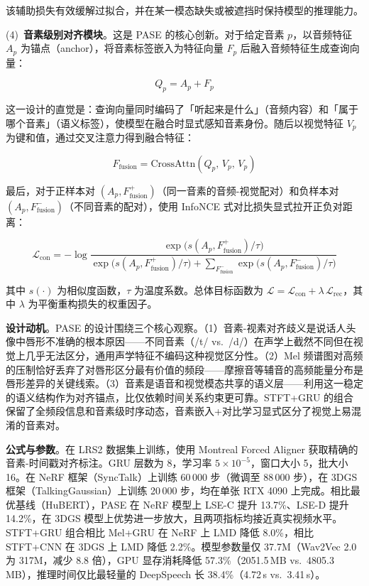 该辅助损失有效缓解过拟合，并在某一模态缺失或被遮挡时保持模型的推理能力。

(4)~\textbf{音素级别对齐模块}。这是 PASE 的核心创新。对于给定音素 $p$，以音频特征 $A_p$ 为锚点（anchor），将音素标签嵌入为特征向量 $F_p$ 后融入音频特征生成查询向量：

\begin{equation}
    Q_p = A_p + F_p
\end{equation}

这一设计的直觉是：查询向量同时编码了「听起来是什么」（音频内容）和「属于哪个音素」（语义标签），使模型在融合时显式感知音素身份。随后以视觉特征 $V_p$ 为键和值，通过交叉注意力得到融合特征：

\begin{equation}
    F_\text{fusion} = \mathrm{CrossAttn}(Q_p,\, V_p,\, V_p)
\end{equation}

最后，对于正样本对 $(A_p, F^+_\text{fusion})$（同一音素的音频-视觉配对）和负样本对 $(A_p, F^-_\text{fusion})$（不同音素的配对），使用 InfoNCE 式对比损失显式拉开正负对距离：

\begin{equation}
    \mathcal{L}_\text{con} = -\log \frac{\exp\big(s(A_p, F^+_\text{fusion}) / \tau\big)}{\exp\big(s(A_p, F^+_\text{fusion}) / \tau\big) + \sum_{F^-_\text{fusion}} \exp\big(s(A_p, F^-_\text{fusion}) / \tau\big)}
\end{equation}

其中 $s(\cdot)$ 为相似度函数，$\tau$ 为温度系数。总体目标函数为 $\mathcal{L} = \mathcal{L}_\text{con} + \lambda\, \mathcal{L}_\text{rec}$，其中 $\lambda$ 为平衡重构损失的权重因子。

\textbf{设计动机}。PASE 的设计围绕三个核心观察。（1）音素-视素对齐歧义是说话人头像中唇形不准确的根本原因——不同音素（/t/ vs.\ /d/）在声学上截然不同但在视觉上几乎无法区分，通用声学特征不编码这种视觉区分性。（2）Mel 频谱图对高频的压制恰好丢弃了对唇形区分最有价值的频段——摩擦音等辅音的高频能量分布是唇形差异的关键线索。（3）音素是语音和视觉模态共享的语义层——利用这一稳定的语义结构作为对齐锚点，比仅依赖时间关系约束更可靠。STFT+GRU 的组合保留了全频段信息和音素级时序动态，音素嵌入+对比学习显式区分了视觉上易混淆的音素对。

\textbf{公式与参数}。在 LRS2 数据集上训练，使用 Montreal Forced Aligner 获取精确的音素-时间戳对齐标注。GRU 层数为 8，学习率 $5 \times 10^{-5}$，窗口大小 5，批大小 16。在 NeRF 框架（SyncTalk）上训练 60\,000 步（微调至 88\,000 步），在 3DGS 框架（TalkingGaussian）上训练 20\,000 步，均在单张 RTX 4090 上完成。相比最优基线（HuBERT），PASE 在 NeRF 模型上 LSE-C 提升 13.7\%、LSE-D 提升 14.2\%，在 3DGS 模型上优势进一步放大，且两项指标均接近真实视频水平。STFT+GRU 组合相比 Mel+GRU 在 NeRF 上 LMD 降低 8.0\%，相比 STFT+CNN 在 3DGS 上 LMD 降低 2.2\%。模型参数量仅 37.7M（Wav2Vec 2.0 为 317M，减少 8.8 倍），GPU 显存消耗降低 57.3\%（2051.5\,MB vs.\ 4805.3\,MB），推理时间仅比最轻量的 DeepSpeech 长 38.4\%（4.72\,s vs.\ 3.41\,s）。


